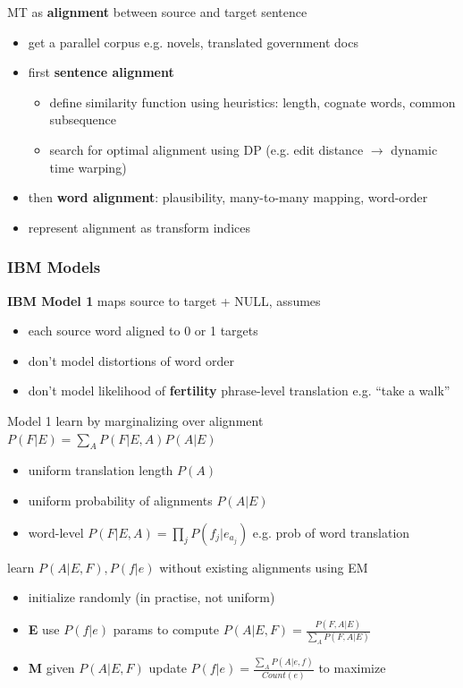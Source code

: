\documentclass[]{article}
\theoremstyle{definition}
\begin{document}
MT as \textbf{alignment} between source and target sentence
\begin{itemize}
    \item get a parallel corpus e.g. novels, translated government docs
    \item first \textbf{sentence alignment}
        \begin{itemize}
            \item define similarity function using heuristics: length, cognate words, common subsequence
            \item search for optimal alignment using DP (e.g. edit distance $\to$ dynamic time warping)
        \end{itemize}
    \item then \textbf{word alignment}: plausibility, many-to-many mapping, word-order
    \item represent alignment as transform indices
\end{itemize}

\subsubsection{IBM Models}%
\label{ssub:ibm_models}

\textbf{IBM Model 1} maps source to target + NULL, assumes
\begin{itemize}
    \item each source word aligned to 0 or 1 targets
    \item don't model distortions of word order
    \item don't model likelihood of \textbf{fertility} phrase-level translation e.g. ``take a walk''
\end{itemize}

Model 1 learn by marginalizing over alignment $P(F|E) = \sum_A P(F|E,A) P(A|E)$
\begin{itemize}
    \item uniform translation length $P(A)$
    \item uniform probability of alignments $P(A|E)$
    \item word-level $P(F|E,A) = \prod_j P(f_j|e_{a_j})$ e.g. prob of word translation
\end{itemize}

learn $P(A|E,F),P(f|e)$ without existing alignments using EM
\begin{itemize}
    \item initialize randomly (in practise, not uniform)
    \item \textbf{E} use $P(f|e)$ params to compute $P(A|E,F) = \frac{P(F,A|E)}{\sum_A P(F,A|E)}$
    \item \textbf{M} given $P(A|E,F)$ update $P(f|e) = \frac{\sum_A P(A|e,f)}{Count(e)}$ to maximize
\end{itemize}
\end{document}
